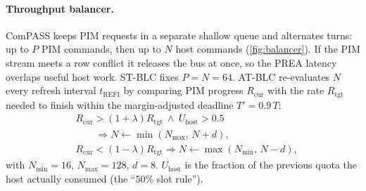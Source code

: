 \documentclass[conference]{IEEEtran}
\newcommand{\stblc}{ST-BLC}
\newcommand{\atblc}{AT-BLC}
\newcommand{\trefi}{t_{\mathrm{REFI}}}
\begin{document}
\paragraph{Throughput balancer.} ComPASS keeps PIM requests in a separate shallow queue and alternates turns: up to $P$ PIM commands, then up to $N$ host commands (\cref{fig:balancer}). If the PIM stream meets a row conflict it releases the bus at once, so the PREA latency overlaps useful host work. \stblc{} fixes $P=N=64$. \atblc{} re-evaluates $N$ every refresh interval $\trefi$ by comparing PIM progress $R_{\mathrm{cur}}$ with the rate $R_{\mathrm{tgt}}$ needed to finish within the margin-adjusted deadline $T'=0.9\,T$:
\begin{align}
&R_{\mathrm{cur}} > (1+\lambda)R_{\mathrm{tgt}}\ \wedge\ U_{\mathrm{host}}>0.5\nonumber\\
&\qquad\Rightarrow N \leftarrow \min(N_{\max},\,N+d),\\
&R_{\mathrm{cur}} < (1-\lambda)R_{\mathrm{tgt}} \Rightarrow N \leftarrow \max(N_{\min},\,N-d),
\end{align}
with $N_{\min}=16$, $N_{\max}=128$, $d=8$. $U_{\mathrm{host}}$ is the fraction of the previous quota the host actually consumed (the ``50\% slot rule'').
\end{document}
